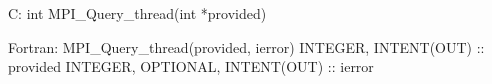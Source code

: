 C:
int MPI_Query_thread(int *provided)

Fortran:
MPI_Query_thread(provided, ierror)
INTEGER, INTENT(OUT) :: provided
INTEGER, OPTIONAL, INTENT(OUT) :: ierror
